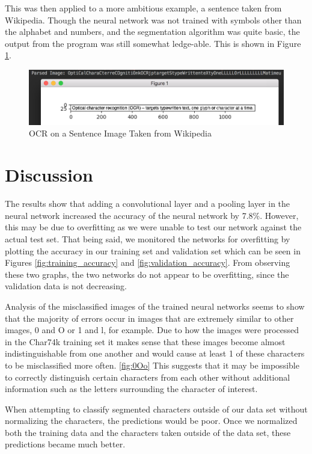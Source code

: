 \documentclass[11pt]{article}
\begin{document}
This was then applied to a more ambitious example, a sentence taken from Wikipedia. \cite{ocr_wiki_2017} Though the neural network was not trained with symbols other than the alphabet and numbers, and the segmentation algorithm was quite basic, the output from the program was still somewhat ledge-able. This is shown in Figure \ref{fig:sentence_ocr}.

\begin{figure}
    \centering
    \includegraphics[scale=0.6]{sentence.png}
    \caption{OCR on a Sentence Image Taken from Wikipedia}
    \label{fig:sentence_ocr}
\end{figure}

\section{Discussion}

The results show that adding a convolutional layer and a pooling layer in the neural network increased the accuracy of the neural network by 7.8\%. However, this may be due to overfitting as we were unable to test our network against the actual test set. That being said, we monitored the networks for overfitting by plotting the accuracy in our training set and validation set which can be seen in Figures \ref{fig:training_accuracy} and \ref{fig:validation_accuracy}.  From observing these two graphs, the two networks do not appear to be overfitting, since the validation data is not decreasing.

Analysis of the misclassified images of the trained neural networks seems to show that the majority of errors occur in images that are extremely similar to other images, 0 and O or 1 and l, for example. Due to how the images were processed in the Char74k training set it makes sense that these images become almost indistinguishable from one another and would cause at least 1 of these characters to be misclassified more often. \ref{fig:0Oo} This suggests that it may be impossible to correctly distinguish certain characters from each other without additional information such as the letters surrounding the character of interest.

When attempting to classify segmented characters outside of our data set without normalizing the characters, the predictions would be poor. Once we normalized both the training data and the characters taken outside of the data set, these predictions became much better.
\end{document}
